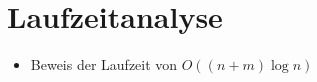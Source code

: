 \section{Laufzeitanalyse}
\label{sec/laufzeit}

\begin{itemize}
	\item Beweis der Laufzeit von $O((n+m)\log n)$
\end{itemize}